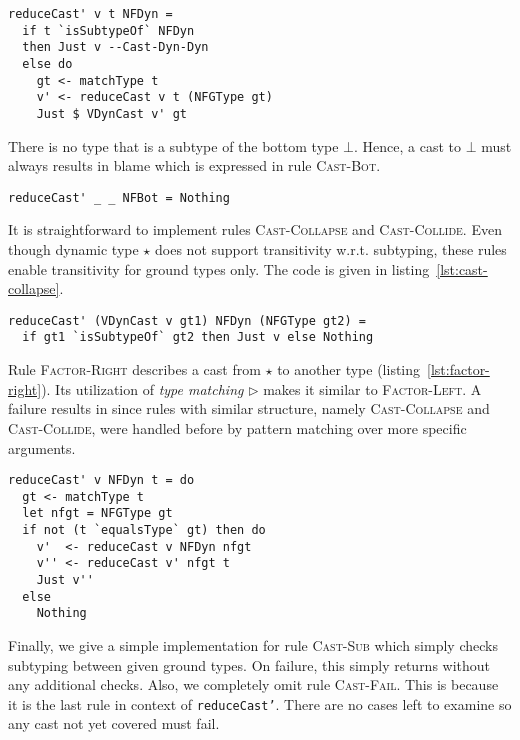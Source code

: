 \begin{lstlisting}[float,
  label=lst:cast-dyn-dyn-factor-left,
  caption=Rules \textsc{Cast-Dyn-Dyn} and \textsc{Factor-Left} (\texttt{Interpreter.hs})]
reduceCast' v t NFDyn =
  if t `isSubtypeOf` NFDyn
  then Just v --Cast-Dyn-Dyn
  else do
    gt <- matchType t
    v' <- reduceCast v t (NFGType gt)
    Just $ VDynCast v' gt
\end{lstlisting}

There is no type that is a subtype of the bottom type $\bot$. Hence, a cast to $\bot$ must always results in blame which is expressed in rule \textsc{Cast-Bot}.

\begin{lstlisting}[caption=Rule \textsc{Cast-Bot} (\texttt{Interpreter.hs})]
reduceCast' _ _ NFBot = Nothing
\end{lstlisting}

It is straightforward to implement rules \textsc{Cast-Collapse} and \textsc{Cast-Collide}. Even though dynamic type $\star$ does not support transitivity w.r.t. subtyping, these rules enable transitivity for ground types only. The code is given in listing~\ref{lst:cast-collapse}.

\begin{lstlisting}[float,
  caption=Rules \textsc{Cast-Collapse} and \textsc{Cast-Collide} (\texttt{Interpreter.hs}),
  label=lst:cast-collapse]
reduceCast' (VDynCast v gt1) NFDyn (NFGType gt2) =
  if gt1 `isSubtypeOf` gt2 then Just v else Nothing
\end{lstlisting}

Rule \textsc{Factor-Right} describes a cast from $\star$ to another type (listing~\ref{lst:factor-right}). Its utilization of \emph{type matching} $\rhd$ makes it similar to \textsc{Factor-Left}. A failure results in \blame since rules with similar structure, namely \textsc{Cast-Collapse} and \textsc{Cast-Collide}, were handled before by pattern matching over more specific arguments.

\begin{lstlisting}[float,
  caption=Rule \textsc{Factor-Right} (\texttt{Interpreter.hs}),
  label=lst:factor-right]
reduceCast' v NFDyn t = do
  gt <- matchType t
  let nfgt = NFGType gt
  if not (t `equalsType` gt) then do
    v'  <- reduceCast v NFDyn nfgt
    v'' <- reduceCast v' nfgt t
    Just v''
  else
    Nothing
\end{lstlisting}

Finally, we give a simple implementation for rule \textsc{Cast-Sub} which simply checks subtyping between given ground types. On failure, this simply returns \blame without any additional checks. Also, we completely omit rule \textsc{Cast-Fail}. This is because it is the last rule in context of \texttt{reduceCast'}. There are no cases left to examine so any cast not yet covered must fail.


